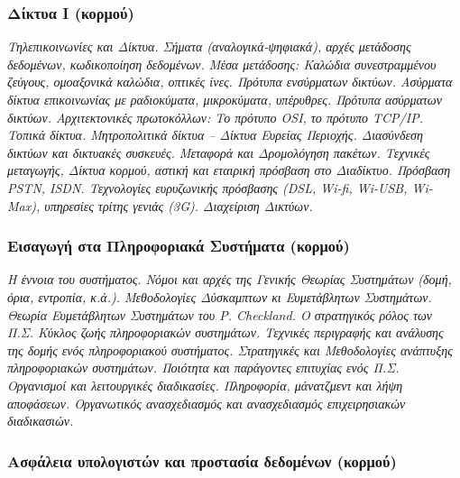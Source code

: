 \hypertarget{ux3b4ux3afux3baux3c4ux3c5ux3b1-i-ux3baux3bfux3c1ux3bcux3bfux3cd}{%
\subsubsection{Δίκτυα I
(κορμού)}\label{ux3b4ux3afux3baux3c4ux3c5ux3b1-i-ux3baux3bfux3c1ux3bcux3bfux3cd}}

\emph{Τηλεπικοινωνίες και Δίκτυα. Σήματα (αναλογικά-ψηφιακά), αρχές
μετάδοσης δεδομένων, κωδικοποίηση δεδομένων. Μέσα μετάδοσης: Καλώδια
συνεστραμμένου ζεύγους, ομοαξονικά καλώδια, οπτικές ίνες. Πρότυπα
ενσύρματων δικτύων. Ασύρματα δίκτυα επικοινωνίας με ραδιοκύματα,
μικροκύματα, υπέρυθρες. Πρότυπα ασύρματων δικτύων. Αρχιτεκτονικές
πρωτοκόλλων: Το πρότυπο OSI, το πρότυπο TCP/IP. Τοπικά δίκτυα.
Μητροπολιτικά δίκτυα -- Δίκτυα Ευρείας Περιοχής. Διασύνδεση δικτύων και
δικτυακές συσκευές. Μεταφορά και Δρομολόγηση πακέτων. Τεχνικές
μεταγωγής, Δίκτυα κορμού, αστική και εταιρική πρόσβαση στο Διαδίκτυο.
Πρόσβαση PSTN, ISDN. Τεχνολογίες ευρυζωνικής πρόσβασης (DSL, Wi-fi,
Wi-USB, Wi-Max), υπηρεσίες τρίτης γενιάς (3G). Διαχείριση Δικτύων.}

\hypertarget{ux3b5ux3b9ux3c3ux3b1ux3b3ux3c9ux3b3ux3ae-ux3c3ux3c4ux3b1-ux3c0ux3bbux3b7ux3c1ux3bfux3c6ux3bfux3c1ux3b9ux3b1ux3baux3ac-ux3c3ux3c5ux3c3ux3c4ux3aeux3bcux3b1ux3c4ux3b1-ux3baux3bfux3c1ux3bcux3bfux3cd}{%
\subsubsection{Εισαγωγή στα Πληροφοριακά Συστήματα
(κορμού)}\label{ux3b5ux3b9ux3c3ux3b1ux3b3ux3c9ux3b3ux3ae-ux3c3ux3c4ux3b1-ux3c0ux3bbux3b7ux3c1ux3bfux3c6ux3bfux3c1ux3b9ux3b1ux3baux3ac-ux3c3ux3c5ux3c3ux3c4ux3aeux3bcux3b1ux3c4ux3b1-ux3baux3bfux3c1ux3bcux3bfux3cd}}

\emph{Η έννοια του συστήματος. Νόμοι και αρχές της Γενικής Θεωρίας
Συστημάτων (δομή, όρια, εντροπία, κ.ά.). Μεθοδολογίες Δύσκαμπτων κι
Ευμετάβλητων Συστημάτων. Θεωρία Ευμετάβλητων Συστημάτων του P.
Checkland. Ο στρατηγικός ρόλος των Π.Σ. Κύκλος ζωής πληροφοριακών
συστημάτων. Τεχνικές περιγραφής και ανάλυσης της δομής ενός
πληροφοριακού συστήματος. Στρατηγικές και Μεθοδολογίες ανάπτυξης
πληροφοριακών συστημάτων. Ποιότητα και παράγοντες επιτυχίας ενός Π.Σ.
Οργανισμοί και λειτουργικές διαδικασίες. Πληροφορία, μάνατζμεντ και λήψη
αποφάσεων. Οργανωτικός ανασχεδιασμός και ανασχεδιασμός επιχειρησιακών
διαδικασιών.}

\hypertarget{ux3b1ux3c3ux3c6ux3acux3bbux3b5ux3b9ux3b1-ux3c5ux3c0ux3bfux3bbux3bfux3b3ux3b9ux3c3ux3c4ux3ceux3bd-ux3baux3b1ux3b9-ux3c0ux3c1ux3bfux3c3ux3c4ux3b1ux3c3ux3afux3b1-ux3b4ux3b5ux3b4ux3bfux3bcux3adux3bdux3c9ux3bd-ux3baux3bfux3c1ux3bcux3bfux3cd}{%
\subsubsection{Ασφάλεια υπολογιστών και προστασία δεδομένων
(κορμού)}\label{ux3b1ux3c3ux3c6ux3acux3bbux3b5ux3b9ux3b1-ux3c5ux3c0ux3bfux3bbux3bfux3b3ux3b9ux3c3ux3c4ux3ceux3bd-ux3baux3b1ux3b9-ux3c0ux3c1ux3bfux3c3ux3c4ux3b1ux3c3ux3afux3b1-ux3b4ux3b5ux3b4ux3bfux3bcux3adux3bdux3c9ux3bd-ux3baux3bfux3c1ux3bcux3bfux3cd}}

